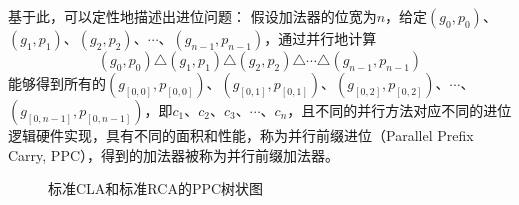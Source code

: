 基于此，可以定性地描述出进位问题：
假设加法器的位宽为$n$，给定$(g_0,p_0)$、$(g_1,p_1)$、$(g_2,p_2)$、$\cdots$、$(g_{n-1},p_{n-1})$，通过并行地计算
\begin{equation}
    (g_0,p_0) \triangle (g_1,p_1) \triangle (g_2,p_2) \triangle \cdots \triangle (g_{n-1},p_{n-1})
\end{equation}
能够得到所有的$(g_{[0,0]},p_{[0,0]})$、$(g_{[0,1]},p_{[0,1]})$、$(g_{[0,2]},p_{[0,2]})$、$\cdots$、$(g_{[0,n-1]},p_{[0,n-1]})$，即$c_1$、$c_2$、$c_3$、$\cdots$、$c_n$，且不同的并行方法对应不同的进位逻辑硬件实现，具有不同的面积和性能，称为并行前缀进位（Parallel Prefix Carry, PPC），得到的加法器被称为并行前缀加法器。
\begin{figure}[!htb]
    \centering
\caption{标准CLA和标准RCA的PPC树状图}
\label{EM:Fig:PPC_CLA_RCA}
\end{figure}
